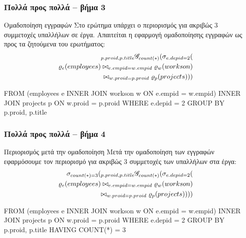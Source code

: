 \begin{frame}
\frametitle{Πολλά προς πολλά -- βήμα 3}
\begin{minipage}{\wE}
\vspace{-0.5cm}
\begin{block}{\small Ομαδοποίηση εγγραφών}
Στο ερώτημα υπάρχει ο περιορισμός για ακριβώς 3 συμμετοχές υπαλλήλων σε έργα.
Απαιτείται η εφαρμογή ομαδοποίησης εγγραφών ως προς τα ζητούμενα του ερωτήματος:
\pause
\[
\begin{split}
  {}_{p.proid, p.title} \mathscr{G}_{count(*)}
    (
      \sigma_{e.depid=2}
      (                           \\
        \varrho_{e} (employees) \bowtie_{e.empid=w.empid} \varrho_{w} (workson)  \\
                                \bowtie_{w.proid=p.proid} \varrho_{p} (projects)
      )
    )
\end{split}
\]
\pause
\vspace{-0.5cm}
\en
\begin{SQL}
    FROM (employees e INNER JOIN workson w
                         ON e.empid = w.empid)
                      INNER JOIN projects p
                         ON w.proid = p.proid
   WHERE e.depid = 2
GROUP BY p.proid, p.title
\end{SQL}
\el
  \end{block}
\end{minipage}
\end{frame}


\begin{frame}
\frametitle{Πολλά προς πολλά -- βήμα 4}
\begin{minipage}{\wE}
\vspace{-0.5cm}
\begin{block}{\small Περιορισμός μετά την ομαδοποίηση}
Μετά την ομαδοποίηση των εγγραφών
εφαρμόσουμε τον περιορισμό για ακριβώς 3 συμμετοχές των υπαλλήλων στα έργα:
\[
\begin{split}
  \sigma_{count(*)=3}
  (
    {}_{p.proid, p.title} \mathscr{G}_{count(*)}
    (
      \sigma_{e.depid=2}
      (                           \\
        \varrho_{e} (employees) \bowtie_{e.empid=w.empid} \varrho_{w} (workson)  \\
                                \bowtie_{w.proid=p.proid} \varrho_{p} (projects)
      )
    )
  )
\end{split}
\]
\pause
\vspace{-0.5cm}
\en
\begin{SQL}
    FROM (employees e INNER JOIN workson w
                         ON e.empid = w.empid)
                      INNER JOIN projects p
                         ON w.proid = p.proid
   WHERE e.depid = 2
GROUP BY p.proid, p.title
  HAVING COUNT(*) = 3
\end{SQL}
\el
  \end{block}
\end{minipage}
\end{frame}


